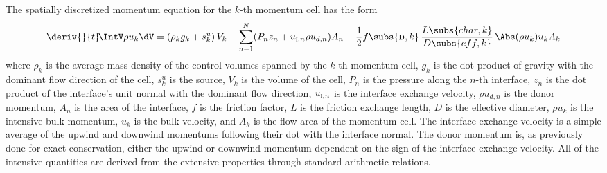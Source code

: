 The spatially discretized momentum equation for the $k$-th momentum cell has the form
\begin{equation}
    \deriv{}{t}\! \IntV \rho u_k \dV = 
    (\rho_k g_k + s^u_k)\,V_k 
    - \sum_{n=1}^{N}   (P_n z_n +  u_{\text{\textsc{i}},n} \rho{u}_{d,n}) A_n 
    - \frac{1}{2} f\subs{\textsc{d},k}\,\frac{L\subs{char,k}}{D\subs{eff,k}}\,\Abs(\rho{u}_k) u_k A_k  \label{Eqn:SemiMomentum}
\end{equation}
where $\rho_k$ is the average mass density of the control volumes spanned by the $k$-th momentum cell, $g_k$ is the dot product of gravity with the dominant flow direction of the cell, $s^u_k$ is the source, $V_k$ is the volume of the cell, $P_n$ is the pressure along the $n$-th interface, $z_n$ is the dot product of the interface's unit normal with the dominant flow direction, $u_{\text{\textsc{i}},n}$ is the interface exchange velocity,
$\rho{u}_{d,n}$ is the donor momentum, $A_n$ is the area of the interface, 
$f$ is the friction factor, $L$ is the friction exchange length, $D$ is the effective diameter, 
$\rho{u}_k$ is the intensive bulk momentum, $u_k$ is the bulk velocity, and $A_k$ is the flow area of the momentum cell.
The interface exchange velocity is a simple average of the upwind and downwind momentums following their dot with the interface normal.
The donor momentum is, as previously done for exact conservation, either the upwind or downwind momentum dependent on the sign of the interface exchange velocity.
All of the intensive quantities are derived from the extensive properties through standard arithmetic relations.


